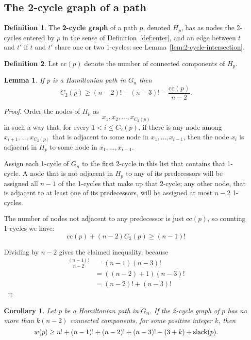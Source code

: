 \documentclass[a4paper]{article}
\newtheorem{lemma}{Lemma}
\newtheorem{cor}{Corollary}
\theoremstyle{definition}
\newtheorem{defn}{Definition}[section]
\theoremstyle{remark}
\let\definiendum\textbf
\begin{document}
\subsection{The 2-cycle graph of a path}\label{s:2-cycle-graph}
\begin{defn}
    The \definiendum{2-cycle graph} of a path $p$, denoted $H_p$, has as nodes the 2-cycles entered by $p$ in the sense of Definition~\ref{def:enter}, and an edge between $t$ and $t'$ if $t$ and $t'$ share one or two 1-cycles: see Lemma~\ref{lem:2-cycle-intersection}.
\end{defn}

\def\cc{\mathrm{cc}}
\begin{defn}
    Let $\cc(p)$ denote the number of connected components of $H_p$.
\end{defn}
\begin{lemma}\label{lem:few-ccs}
If $p$ is a Hamiltonian path in $G_n$ then
\[
    C_2(p) \ge (n-2)! + (n-3)! - \frac{\cc(p)}{n-2}.
\]
\end{lemma}
\begin{proof}
    Order the nodes of $H_p$ as
    \[
        x_1, x_2, \dots, x_{C_2(p)}
    \]
    in such a way that, for every $1 < i \le C_2(p)$, if there is any node among
    $x_{i+1},\dots,x_{C_2(p)}$ that is adjacent to some node in $x_1,\dots,x_{i-1}$,
    then the node $x_i$ is adjacent in $H_p$ to some node in $x_1,\dots,x_{i-1}$.

    Assign each 1-cycle of $G_n$ to the first 2-cycle in this list that contains that 1-cycle. A node that is not adjacent in $H_p$ to any of its predecessors will be assigned all $n-1$ of the 1-cycles that make up that 2-cycle; any other node, that is adjacent to at least one of its predecessors, will be assigned at most $n-2$ 1-cycles.

    The number of nodes not adjacent to any predecessor is just $\cc(p)$, so counting 1-cycles we have:
    \[
        \cc(p) + (n-2)C_2(p) \ge (n-1)!
    \]

    Dividing by $n-2$ gives the claimed inequality, because
    \begin{align*}
        \frac{(n-1)!}{n-2} &= (n-1)(n-3)! \\
        &= ((n-2)+1)(n-3)! \\
        &= (n-2)! + (n-3)!
    \end{align*}
\end{proof}
\begin{cor}\label{cor:few-ccs}
    Let $p$ be a Hamiltonian path in $G_n$.
    If the 2-cycle graph of $p$ has no more than $k(n-2)$ connected components, for some positive integer $k$, then
    \[
        w(p) \ge n! + (n-1)! + (n-2)! + (n-3)! - (3 + k) + \mathrm{slack}(p).
    \]
\end{cor}
\end{document}
